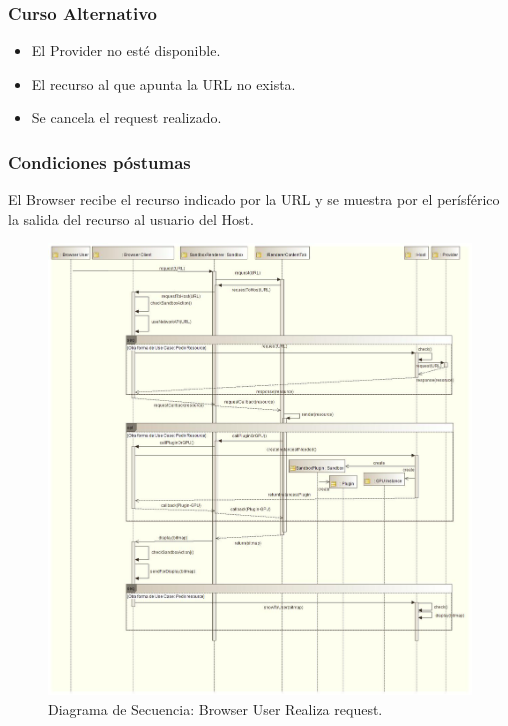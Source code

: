 \subsubsection{Curso Alternativo} 
\begin{itemize}
\item El Provider no esté disponible.
\item El recurso al que apunta la URL no exista.
\item Se cancela el request realizado.
	\end{itemize}
\subsubsection{Condiciones póstumas} El Browser recibe el recurso indicado por la URL y se muestra por el perísférico la salida del recurso al usuario del Host.
	    \begin{figure}[h!t]
	        \centering
	        \includegraphics[scale=0.35]{figures/chap4/requestResource.jpg}
	        \caption{Diagrama de Secuencia: Browser User Realiza request.}
	        \label{fig:SecReq}
	    \end{figure}

